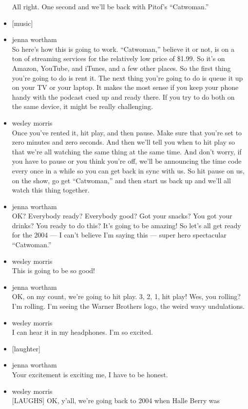 \begin{itemize}
  All right. One second and we'll be back with Pitof's ``Catwoman.''
\item
  {[}music{]}
\item
  jenna wortham\\
  So here's how this is going to work. ``Catwoman,'' believe it or not,
  is on a ton of streaming services for the relatively low price of
  \$1.99. So it's on Amazon, YouTube, and iTunes, and a few other
  places. So the first thing you're going to do is rent it. The next
  thing you're going to do is queue it up on your TV or your laptop. It
  makes the most sense if you keep your phone handy with the podcast
  cued up and ready there. If you try to do both on the same device, it
  might be really challenging.
\item
  wesley morris\\
  Once you've rented it, hit play, and then pause. Make sure that you're
  set to zero minutes and zero seconds. And then we'll tell you when to
  hit play so that we're all watching the same thing at the same time.
  And don't worry, if you have to pause or you think you're off, we'll
  be announcing the time code every once in a while so you can get back
  in sync with us. So hit pause on us, on the show, go get ``Catwoman,''
  and then start us back up and we'll all watch this thing together.
\item
  jenna wortham\\
  OK? Everybody ready? Everybody good? Got your snacks? You got your
  drinks? You ready to do this? It's going to be amazing! So let's all
  get ready for the 2004 --- I can't believe I'm saying this --- super
  hero spectacular ``Catwoman.''
\item
  wesley morris\\
  This is going to be so good!
\item
  jenna wortham\\
  OK, on my count, we're going to hit play. 3, 2, 1, hit play! Wes, you
  rolling? I'm rolling. I'm seeing the Warner Brothers logo, the weird
  wavy undulations.
\item
  wesley morris\\
  I can hear it in my headphones. I'm so excited.
\item
  {[}laughter{]}
\item
  jenna wortham\\
  Your excitement is exciting me, I have to be honest.
\item
  wesley morris\\
  {[}LAUGHS{]} OK, y'all, we're going back to 2004 when Halle Berry was

\end{itemize}
